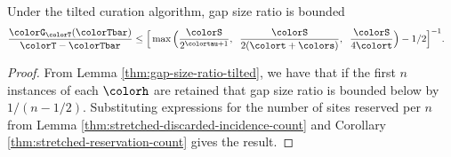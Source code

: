 \begin{theorem}
\label{thm:tilted-gap-size}
Under the tilted curation algorithm, gap size ratio is bounded
\begin{align*}
  \frac{\colorG_{\colorT}(\colorTbar)}{\colorT - \colorTbar}
  &\leq
  \Big[
    \max\Big(
      \frac{\colorS}{2^{\colortau + 1}},\;\;
      \frac{\colorS}{2(\colort + \colors)},\;\;
      \frac{\colorS}{4\colort}
    \Big)
    - 1/2
  \Big]^{-1}.
\end{align*}
\end{theorem}
\begin{proof}

From Lemma \ref{thm:gap-size-ratio-tilted}, we have that if the first $n$ instances of each \hv{} $\colorh$ are retained that gap size ratio is bounded below by $1/(n - 1/2)$.
Substituting expressions for the number of sites reserved per \hv{} $n$ from Lemma \ref{thm:stretched-discarded-incidence-count} and Corollary \ref{thm:stretched-reservation-count} gives the result.
\end{proof}
